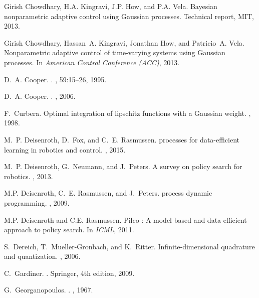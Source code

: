 \documentclass{article} %
\theoremstyle{definition}
\theoremstyle{remark}
\begin{document}
\begin{thebibliography}{10}
	Girish Chowdhary, H.A. Kingravi, J.P. How, and P.A. Vela.
	\newblock Bayesian nonparametric adaptive control using {Gaussian} processes.
	\newblock Technical report, MIT, 2013.
	
	Girish Chowdhary, Hassan~A. Kingravi, Jonathan How, and Patricio~A. Vela.
	\newblock Nonparametric adaptive control of time-varying systems using
	{Gaussian} processes.
	\newblock In {\em American Control Conference (ACC)}, 2013.
	
	D.~A. Cooper.
	.
	, 59:15--26, 1995.
	
	D.~A. Cooper.
	.
	, 2006.
	
	F.~Curbera.
	\newblock Optimal integration of lipschitz functions with a {Gaussian} weight.
	, 1998.
	
	M.~P. Deisenroth, D.~Fox, and C.~E. Rasmussen.
	 processes for data-efficient learning in robotics and
	control.
	,
	2015.
	
	M.~P. Deisenroth, G.~Neumann, and J.~Peters.
	\newblock A survey on policy search for robotics.
	, 2013.
	
	M.P. Deisenroth, C.~E. Rasmussen, and J.~Peters.
	 process dynamic programming.
	, 2009.
	
	M.P. Deisenroth and C.E. Rasmussen.
	\newblock Pilco : A model-based and data-efficient approach to policy search.
	\newblock In {\em ICML}, 2011.
	
	S.~Dereich, T.~Mueller-Gronbach, and K.~Ritter.
	\newblock Infinite-dimensional quadrature and quantization.
	, 2006.
	
	C.~Gardiner.
	.
	\newblock Springer, 4th edition, 2009.
	
	G.~Georganopoulos.
	.
	, 1967.
	

\end{thebibliography}
\end{document}
